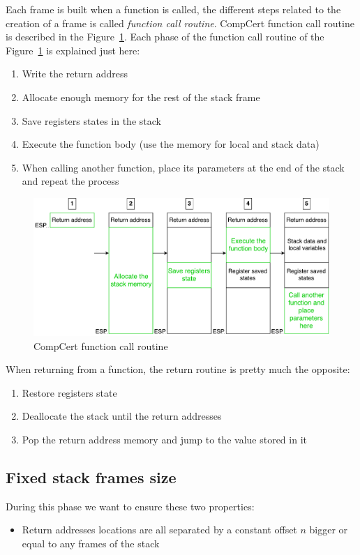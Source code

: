 \documentclass[11pt]{sdm}
\begin{document}
Each frame is built when a function is called, the different steps related to the creation of a frame is called \textit{function call routine}.
CompCert function call routine is described in the Figure~\ref{call_routine}. Each phase of the function call routine of the Figure~\ref{call_routine} is explained just here:
\begin{enumerate}
	\item Write the return address
	\item Allocate enough memory for the rest of the stack frame
	\item Save registers states in the stack
	\item Execute the function body (use the memory for local and stack data)
	\item When calling another function, place its parameters at the end of the stack and repeat the process
\end{enumerate}

\begin{figure}[!ht]
\centering
\includegraphics[scale=0.55]{images/call_routine.pdf}
\caption{CompCert function call routine}
\label{call_routine}
\end{figure}

When returning from a function, the return routine is pretty much the opposite:
\begin{enumerate}
	\item Restore registers state
	\item Deallocate the stack until the return addresses
	\item Pop the return address memory and jump to the value stored in it
\end{enumerate}


\subsection{Fixed stack frames size}
During this phase we want to ensure these two properties:
\begin{itemize}
	\item Return addresses locations are all separated by a constant offset $n$ bigger or equal to any frames of the stack
\end{itemize}
\end{document}
